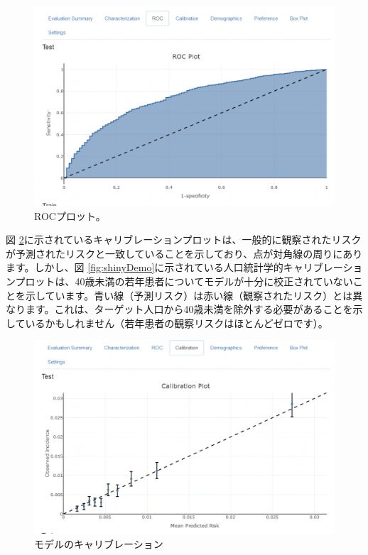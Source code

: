 \documentclass[
  11pt]{book}
\theoremstyle{definition}
\theoremstyle{definition}
\theoremstyle{definition}
\theoremstyle{definition}
\theoremstyle{remark}
\begin{document}
\begin{figure}

{\centering \includegraphics[width=1\linewidth]{images/PatientLevelPrediction/shiny/singleShiny/singleShinyRoc} 

}

\caption{ROCプロット。}\label{fig:shinyROC}
\end{figure}

図 \ref{fig:shinyCal}に示されているキャリブレーションプロットは、一般的に観察されたリスクが予測されたリスクと一致していることを示しており、点が対角線の周りにあります。しかし、図 \ref{fig:shinyDemo}に示されている人口統計学的キャリブレーションプロットは、40歳未満の若年患者についてモデルが十分に校正されていないことを示しています。青い線（予測リスク）は赤い線（観察されたリスク）とは異なります。これは、ターゲット人口から40歳未満を除外する必要があることを示しているかもしれません（若年患者の観察リスクはほとんどゼロです）。

\begin{figure}

{\centering \includegraphics[width=1\linewidth]{images/PatientLevelPrediction/shiny/singleShiny/singleShinyCal} 

}

\caption{モデルのキャリブレーション}\label{fig:shinyCal}
\end{figure}
\end{document}
